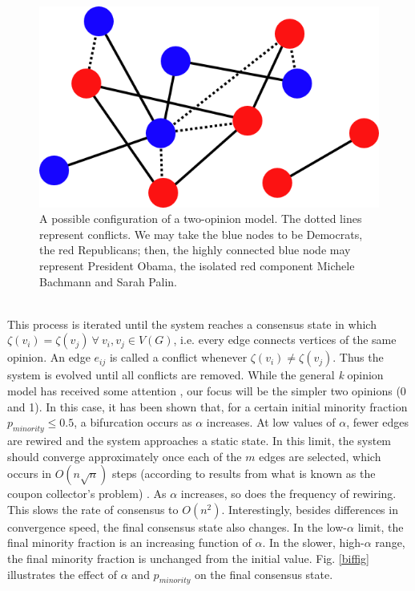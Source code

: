 \documentclass[11pt]{article}
\begin{document}
\begin{figure}[h!]
  \centering
  \includegraphics[width=.5\linewidth]{votingModel}
  \caption{A possible configuration of a two-opinion model. The dotted lines represent conflicts. We may take the blue nodes to be Democrats, the red Republicans; then, the highly connected blue node may represent President Obama, the isolated red component Michele Bachmann and Sarah Palin.}
  \label{fig:graphA}
\end{figure}
\\
This process is iterated until the system reaches a consensus state in which $\zeta(v_{i}) = \zeta(v_{j}) \ \forall \ v_{i}, v_{j} \in V(G)$, i.e. every edge connects vertices of the same opinion. An edge $e_{ij}$ is called a conflict whenever $\zeta(v_{i}) \ne \zeta(v_{j})$. Thus the system is evolved until all conflicts are removed. While the general \textit{k} opinion model has received some attention \cite{durretts preprint?}, our focus will be the simpler two opinions (0 and 1). In this case, it has been shown that, for a certain initial minority fraction $p_{minority} \le 0.5$, a bifurcation occurs as $\alpha$ increases. At low values of $\alpha$, fewer edges are rewired and the system approaches a static state. In this limit, the system should converge approximately once each of the $m$ edges are selected, which occurs in $O(n\sqrt{n})$ steps (according to results from what is known as the coupon collector's problem) \cite{durrett}. As $\alpha$ increases, so does the frequency of rewiring. This slows the rate of consensus to $O(n^{2})$. Interestingly, besides differences in convergence speed, the final consensus state also changes. In the low-$\alpha$ limit, the final minority fraction is an increasing function of $\alpha$. In the slower, high-$\alpha$ range, the final minority fraction is unchanged from the initial value. Fig. \ref{biffig} illustrates the effect of $\alpha$ and $p_{minority}$ on the final consensus state.\vspace{1mm}\\
\end{document}
